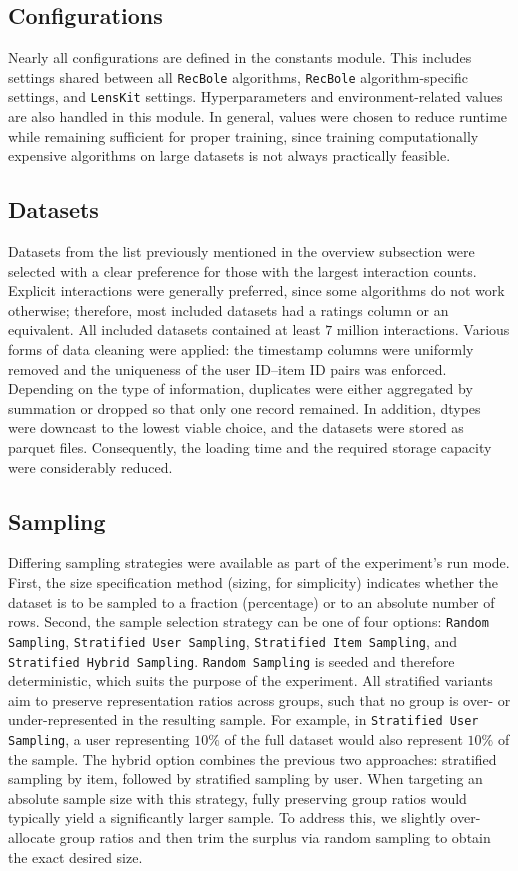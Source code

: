 \documentclass[sigconf,nonacm]{acmart}
\begin{document}
\subsection{Configurations}
Nearly all configurations are defined in the constants module. This includes settings shared between all \texttt{RecBole} algorithms, \texttt{RecBole} algorithm-specific settings, and \texttt{LensKit} settings. Hyperparameters and environment-related values are also handled in this module. In general, values were chosen to reduce runtime while remaining sufficient for proper training, since training computationally expensive algorithms on large datasets is not always practically feasible.

\subsection{Datasets}
Datasets from the list \cite{recbole_datasets_page, recbole_datasets_repo} previously mentioned in the overview subsection were selected with a clear preference for those with the largest interaction counts. Explicit interactions were generally preferred, since some algorithms do not work otherwise; therefore, most included datasets had a ratings column or an equivalent. All included datasets contained at least $7$ million interactions. Various forms of data cleaning were applied: the timestamp columns were uniformly removed and the uniqueness of the user ID–item ID pairs was enforced. Depending on the type of information, duplicates were either aggregated by summation or dropped so that only one record remained. In addition, dtypes were downcast to the lowest viable choice, and the datasets were stored as parquet \cite{parquet} files. Consequently, the loading time and the required storage capacity were considerably reduced.

\subsection{Sampling}
Differing sampling strategies were available as part of the experiment’s run mode. First, the size specification method (sizing, for simplicity) indicates whether the dataset is to be sampled to a fraction (percentage) or to an absolute number of rows. Second, the sample selection strategy can be one of four options: \texttt{Random Sampling}, \texttt{Stratified User Sampling}, \texttt{Stratified Item Sampling}, and \texttt{Stratified Hybrid Sampling}. \texttt{Random Sampling} is seeded and therefore deterministic, which suits the purpose of the experiment. All stratified variants aim to preserve representation ratios across groups, such that no group is over- or under-represented in the resulting sample. For example, in \texttt{Stratified User Sampling}, a user representing $10\%$ of the full dataset would also represent $10\%$ of the sample. The hybrid option combines the previous two approaches: stratified sampling by item, followed by stratified sampling by user. When targeting an absolute sample size with this strategy, fully preserving group ratios would typically yield a significantly larger sample. To address this, we slightly over-allocate group ratios and then trim the surplus via random sampling to obtain the exact desired size.
\end{document}
